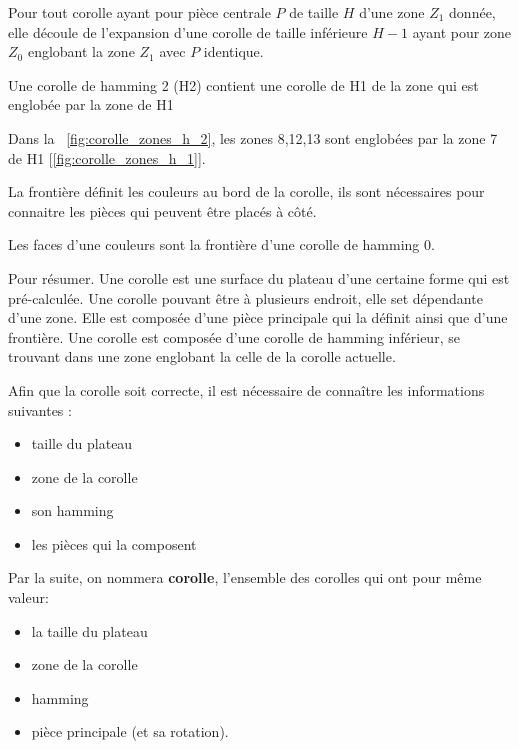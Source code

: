 	
	\begin{defn}
	Pour tout corolle ayant pour pièce centrale $P$ de taille $H$ d'une zone $Z_1$ donnée, elle découle de l'expansion d'une corolle de
	taille inférieure $H-1$ ayant pour zone $Z_0$ englobant la zone $Z_1$ avec $P$ identique.
	\end{defn}
	
	\begin{defn}
		Une corolle de hamming 2 (H2) contient une corolle de H1 de la zone qui est englobée par la zone de H1
	\end{defn}
	\begin{exmp}
		Dans la ~\autoref{fig:corolle_zones_h_2}, les zones 8,12,13 sont englobées par la zone 7 de H1 [\autoref{fig:corolle_zones_h_1}].
	\end{exmp}

	La frontière définit les couleurs au bord de la corolle, ils sont nécessaires pour connaitre les pièces qui peuvent être placés à côté.
	
	\begin{exmp}
		Les faces d'une couleurs sont la frontière d'une corolle de hamming 0.
	\end{exmp}
	
	Pour résumer. Une corolle est une surface du plateau d'une certaine forme qui est pré-calculée. Une corolle pouvant être à plusieurs endroit, elle set dépendante d'une zone. Elle est composée d'une pièce principale qui la définit ainsi que d'une frontière. Une corolle est composée d'une corolle de hamming inférieur, se trouvant dans une zone englobant la celle de la corolle actuelle.
	
	Afin que la corolle soit correcte, il est nécessaire de connaître les informations suivantes :
	\begin{itemize}
		\item taille du plateau
		\item zone de la corolle
		\item son hamming
		\item les pièces qui la composent
	\end{itemize}
	
	Par la suite, on nommera \textbf{corolle}, l'ensemble des corolles qui ont pour même valeur:
	
	\begin{itemize}
		\item la taille du plateau
		\item zone de la corolle
		\item hamming
		\item pièce principale (et sa rotation).
	\end{itemize}
	
